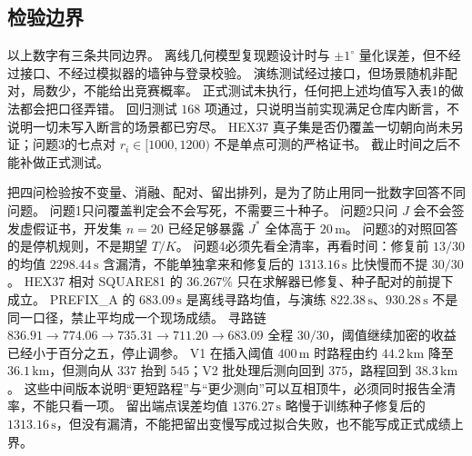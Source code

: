 \subsection{检验边界}

以上数字有三条共同边界。
离线几何模型复现题设计时与 $\pm 1^\circ$ 量化误差，但不经过接口、不经过模拟器的墙钟与登录校验。
演练测试经过接口，但场景随机非配对，局数少，不能给出竞赛概率。
正式测试未执行，任何把上述均值写入表1的做法都会把口径弄错。
回归测试 $168$ 项通过，只说明当前实现满足仓库内断言，不说明一切未写入断言的场景都已穷尽。
HEX37 真子集是否仍覆盖一切朝向尚未另证；问题3的七点对 $r_i\in[1000,1200)$ 不是单点可测的严格证书。
截止时间之后不能补做正式测试。

把四问检验按不变量、消融、配对、留出排列，是为了防止用同一批数字回答不同问题。
问题1只问覆盖判定会不会写死，不需要三十种子。
问题2只问 $J$ 会不会签发虚假证书，开发集 $n=20$ 已经足够暴露 $J^\ast$ 全体高于 $20\,\mathrm{m}$。
问题3的对照回答的是停机规则，不是期望 $T/K$。
问题4必须先看全清率，再看时间：修复前 $13/30$ 的均值 $2298.44\,\mathrm{s}$ 含漏清，不能单独拿来和修复后的 $1313.16\,\mathrm{s}$ 比快慢而不提 $30/30$。
HEX37 相对 SQUARE81 的 $36.267\%$ 只在求解器已修复、种子配对的前提下成立。
PREFIX\_A 的 $683.09\,\mathrm{s}$ 是离线寻路均值，与演练 $822.38\,\mathrm{s}$、$930.28\,\mathrm{s}$ 不是同一口径，禁止平均成一个现场成绩。
寻路链 $836.91\to 774.06\to 735.31\to 711.20\to 683.09$ 全程 $30/30$，阈值继续加密的收益已经小于百分之五，停止调参。
V1 在插入阈值 $400\,\mathrm{m}$ 时路程由约 $44.2\,\mathrm{km}$ 降至 $36.1\,\mathrm{km}$，但测向从 $337$ 抬到 $545$；V2 批处理后测向回到 $375$，路程回到 $38.3\,\mathrm{km}$。
这些中间版本说明“更短路程”与“更少测向”可以互相顶牛，必须同时报告全清率，不能只看一项。
留出端点误差均值 $1376.27\,\mathrm{s}$ 略慢于训练种子修复后的 $1313.16\,\mathrm{s}$，但没有漏清，不能把留出变慢写成过拟合失败，也不能写成正式成绩上界。

